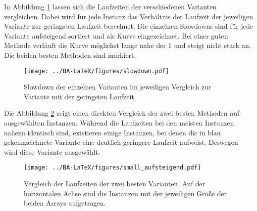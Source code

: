 In Abbildung \ref{fig:messung_slowdown} lassen sich die Laufzeiten der verschiedenen Varianten vergleichen.
Dabei wird für jede Instanz das Verhältnis der Laufzeit der jeweiligen Variante zur geringsten Laufzeit berechnet.
Die einzelnen Slowdowns sind für jede Variante aufsteigend sortiert und als Kurve eingezeichnet.
Bei einer guten Methode verläuft die Kurve möglichst lange nahe der 1 und steigt nicht stark an.
Die beiden besten Methoden sind markiert.


\begin{figure}[H]
\centering
	\texttt{[image: ../BA-LaTeX/figures/slowdown.pdf]}
	\caption[Slowdown der einzelnen Varianten im jeweiligen Vergleich zur Variante mit der geringsten Laufzeit.]
	{Slowdown der einzelnen Varianten im jeweiligen Vergleich zur Variante mit der geringsten Laufzeit.}
	\label{fig:messung_slowdown}
\end{figure}

Die Abbildung \ref{fig:messung_small} zeigt einen direkten Vergleich der zwei besten Methoden auf ausgewählten Instanzen.
Während die Laufzeiten bei den meisten Instanzen nahezu identisch sind, existieren einige Instanzen, bei denen die
in blau gekennzeichnete Variante eine deutlich geringere Laufzeit aufweist. Deswegen wird diese Variante %
ausgewählt.

\begin{figure}[H]
\centering
	\texttt{[image: ../BA-LaTeX/figures/small\_aufsteigend.pdf]}
	\caption[Laufzeitvergleich der zwei besten Varianten auf ausgewählten Instanzen] 
	{Vergleich der Laufzeiten der zwei besten Varianten. Auf der horizontalen Achse sind die Instanzen mit der jeweiligen Größe der beiden Arrays aufgetragen.}
	\label{fig:messung_small}
\end{figure}

